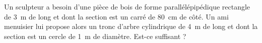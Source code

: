 
\begin{exercice}\label{exo2smath-0131}

    Un sculpteur a besoin d'une pièce de bois de forme parallélépipédique rectangle de \SI{3}{\meter} de long et dont la section est un carré de \SI{80}{\centi\meter} de côté. Un ami menuisier lui propose alors un tronc d'arbre cylindrique de \SI{4}{\meter} de long et dont la section est un cercle de \SI{1}{\meter} de diamètre. Est-ce suffisant ?

\end{exercice}
